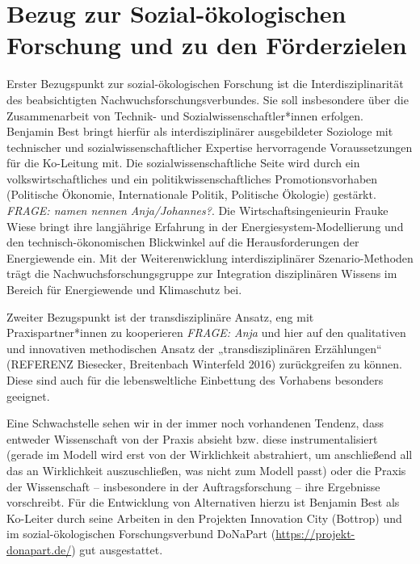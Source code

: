 \documentclass[a4paper,11pt,twoside]{scrartcl}
\begin{document}
\section{Bezug zur Sozial-ökologischen Forschung und zu den Förderzielen}

Erster Bezugspunkt zur sozial-ökologischen Forschung ist die Interdisziplinarität des beabsichtigten Nachwuchsforschungsverbundes. Sie soll insbesondere über die Zusammenarbeit von Technik- und Sozialwissenschaftler*innen erfolgen. Benjamin Best bringt hierfür als interdisziplinärer ausgebildeter Soziologe mit technischer und sozialwissenschaftlicher Expertise hervorragende Voraussetzungen für die Ko-Leitung mit. Die sozialwissenschaftliche Seite wird durch ein volkswirtschaftliches und ein politikwissenschaftliches Promotionsvorhaben (Politische Ökonomie, Internationale Politik, Politische Ökologie) gestärkt. \textit{FRAGE: namen nennen Anja/Johannes?}.
Die Wirtschaftsingenieurin Frauke Wiese bringt ihre langjährige Erfahrung in der Energiesystem-Modellierung und den technisch-ökonomischen Blickwinkel auf die Herausforderungen der Energiewende ein. Mit der Weiterenwicklung interdisziplinärer Szenario-Methoden trägt die Nachwuchsforschungsgruppe zur Integration disziplinären Wissens im Bereich für Energiewende und Klimaschutz bei.

Zweiter Bezugspunkt ist der transdisziplinäre Ansatz, eng mit Praxispartner*innen zu kooperieren \textit{FRAGE: Anja} und hier auf den qualitativen und innovativen methodischen Ansatz der „transdisziplinären Erzählungen“ (REFERENZ Biesecker, Breitenbach Winterfeld 2016) zurückgreifen zu können. Diese sind auch für die lebensweltliche Einbettung des Vorhabens besonders geeignet.

Eine Schwachstelle sehen wir in der immer noch vorhandenen Tendenz, dass entweder Wissenschaft von der Praxis absieht bzw. diese instrumentalisiert (gerade im Modell wird erst von der Wirklichkeit abstrahiert, um anschließend all das an Wirklichkeit auszuschließen, was nicht zum Modell passt) oder die Praxis der Wissenschaft – insbesondere in der Auftragsforschung – ihre Ergebnisse vorschreibt. Für die Entwicklung von Alternativen hierzu ist Benjamin Best als Ko-Leiter durch seine Arbeiten in den Projekten Innovation City (Bottrop) und im sozial-ökologischen Forschungsverbund DoNaPart (\url{https://projekt-donapart.de/}) gut ausgestattet. 
\end{document}
